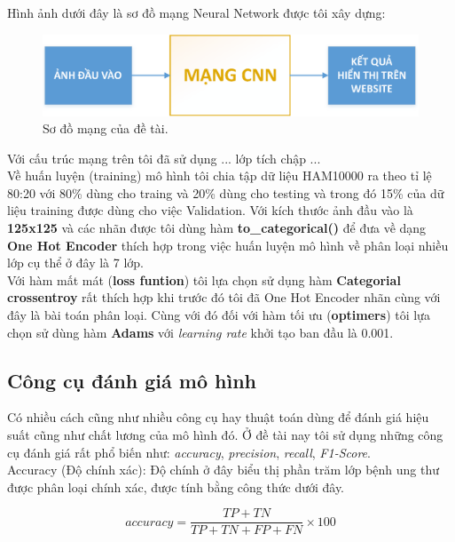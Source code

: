 \documentclass[12pt,a4paper]{article}
\begin{document}
	\noindent
	Hình ảnh dưới đây là sơ đồ mạng Neural Network được tôi xây dựng:
	\begin{figure}[h!]
		\centering
		\includegraphics[width=0.8\linewidth]{./images/soDo_1.eps}
		\caption{Sơ đồ mạng của đề tài.}
		\label{fig:soDoMang}
	\end{figure}
	
	\noindent
	Với cấu trúc mạng trên tôi đã sử dụng ... lớp tích chập ...\\
	
	\noindent
	Về huấn luyện (training) mô hình tôi chia tập dữ liệu HAM10000 ra theo tỉ lệ 80:20 với 80\% dùng cho traing và 20\% dùng cho testing và trong đó 15\% của dữ liệu training được dùng cho việc Validation. Với kích thước ảnh đầu vào là \textbf{125x125} và các nhãn được tôi dùng hàm \textbf{to\_categorical()} để đưa về dạng \textbf{One Hot Encoder} thích hợp trong việc huấn luyện mô hình về phân loại nhiều lớp cụ thể ở đây là 7 lớp.\\
	
	\noindent
	Với hàm mất mát (\textbf{loss funtion}) tôi lựa chọn sử dụng hàm \textbf{Categorial crossentroy} rất thích hợp khi trước đó tôi đã One Hot Encoder nhãn cùng với đây là bài toán phân loại. Cùng với đó đối với hàm tối ưu (\textbf{optimers}) tôi lựa chọn sử dùng hàm \textbf{Adams} với \textit{learning rate} khởi tạo ban đầu là 0.001.
	
	\subsection{Công cụ đánh giá mô hình}
	Có nhiều cách cũng như nhiều công cụ hay thuật toán dùng để đánh giá hiệu suất cũng như chất lương của mô hình đó. Ở đề tài nay tôi sử dụng những công cụ đánh giá rất phổ biến như: \textit{accuracy}, \textit{precision}, \textit{recall}, \textit{F1-Score}.\\
	
	\noindent
	Accuracy (Độ chính xác): Độ chính ở đây biểu thị phần trăm lớp bệnh ung thư được phân loại chính xác, được tính bằng công thức dưới đây.
	
	\begin{equation}
		accuracy = \frac{TP + TN}{TP + TN + FP + FN}\times 100
	\end{equation}
\end{document}
